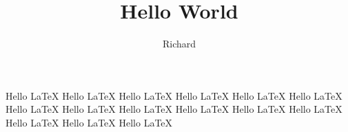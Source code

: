 \documentclass{article}
\title{Hello World}
\author{Richard}
\begin{document}
    \maketitle
    
    Hello \LaTeX
    Hello \LaTeX
    Hello \LaTeX
    Hello \LaTeX
    Hello \LaTeX
    Hello \LaTeX
    Hello \LaTeX
    Hello \LaTeX
    Hello \LaTeX
    Hello \LaTeX
    Hello \LaTeX
    Hello \LaTeX
    Hello \LaTeX
    Hello \LaTeX
    Hello \LaTeX
   
    
    
\end{document}
